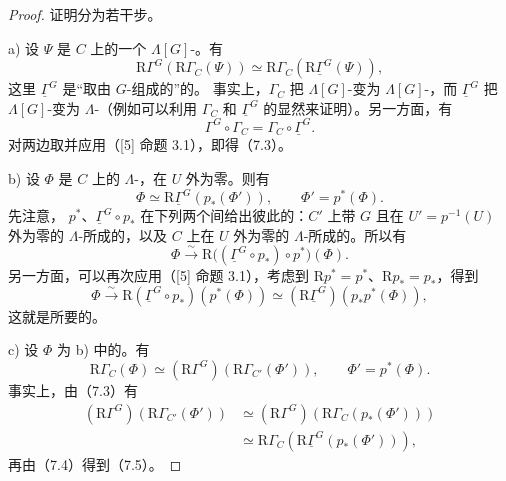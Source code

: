 \begin{proof}
证明分为若干步。

a) 设 $\Psi$ 是 $C$ 上的一个 $\Lambda[G]$-。有
\[
\mathrm R\Gamma^G(\mathrm R\Gamma_C(\Psi))
\simeq\mathrm R\Gamma_C(\mathrm R\underline\Gamma^G(\Psi)),\tag{7.3}
\]
这里 $\underline\Gamma^G$ 是“取由 $G$-组成的”的。
事实上，$\Gamma_C$ 把 $\Lambda[G]$-变为 $\Lambda[G]$-，而 $\underline\Gamma^G$ 把 $\Lambda[G]$-变为 $\Lambda$-（例如可以利用 $\Gamma_C$ 和 $\underline\Gamma^G$ 的显然来证明）。另一方面，有
\[
\Gamma^G\circ\Gamma_C=\Gamma_C\circ\underline\Gamma^G.
\]
对两边取并应用（[5] 命题 3.1），即得（7.3）。

b) 设 $\Phi$ 是 $C$ 上的 $\Lambda$-，在 $U$ 外为零。则有
\[
\Phi\simeq\mathrm R\underline\Gamma^G(p_*(\Phi')),
\qquad\Phi'=p^*(\Phi).\tag{7.4}
\]
先注意， $p^*$、$\underline\Gamma^G\circ p_*$ 在下列两个间给出彼此的：$C'$ 上带 $G$ 且在 $U'=p^{-1}(U)$ 外为零的 $\Lambda$-所成的，以及 $C$ 上在 $U$ 外为零的 $\Lambda$-所成的。所以有
\[
\Phi\xrightarrow{\sim}\mathrm R\bigl((\underline\Gamma^G\circ p_*)\circ p^*\bigr)(\Phi).
\]
另一方面，可以再次应用（[5] 命题 3.1），考虑到 $\mathrm Rp^*=p^*$、$\mathrm Rp_*=p_*$，得到
\[
\Phi\xrightarrow{\sim}\mathrm R(\underline\Gamma^G\circ p_*)(p^*(\Phi))
\simeq(\mathrm R\underline\Gamma^G)(p_*p^*(\Phi)),
\]
这就是所要的。

c) 设 $\Phi$ 为 b) 中的。有
\[
\mathrm R\Gamma_C(\Phi)\simeq
(\mathrm R\Gamma^G)(\mathrm R\Gamma_{C'}(\Phi')),
\qquad\Phi'=p^*(\Phi).\tag{7.5}
\]
事实上，由（7.3）有
\[
\begin{aligned}
(\mathrm R\Gamma^G)(\mathrm R\Gamma_{C'}(\Phi'))
&\simeq(\mathrm R\Gamma^G)(\mathrm R\Gamma_C(p_*(\Phi')))\\
&\simeq\mathrm R\Gamma_C(\mathrm R\underline\Gamma^G(p_*(\Phi'))),
\end{aligned}
\]
再由（7.4）得到（7.5）。


\end{proof}

